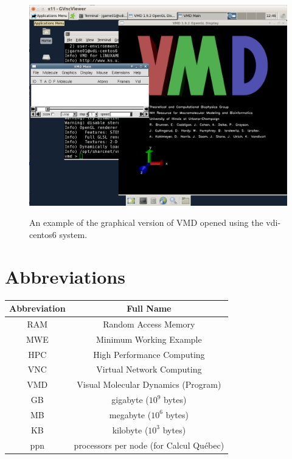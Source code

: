 \documentclass[12pt]{article}
\begin{document}
\begin{figure}[H]
\centering
\caption{An example of the graphical version of VMD opened using the vdi-centos6 system.}
\includegraphics[width=\textwidth]{vdi-vmd-gui}
\label{vdi-vmd-gui}
\end{figure}

\section{Abbreviations}
\centering

\begin{tabular}{c|c}
Abbreviation & Full Name \\
\hline
RAM & Random Access Memory \\
MWE & Minimum Working Example \\
HPC & High Performance Computing \\
VNC & Virtual Network Computing \\
VMD & Visual Molecular Dynamics (Program) \\
GB & gigabyte ($10^9$ bytes) \\
MB & megabyte ($10^6$ bytes) \\
KB & kilobyte ($10^3$ bytes) \\
ppn & processors per node (for Calcul Qu\'{e}bec) \\
\end{tabular}
\end{document}

